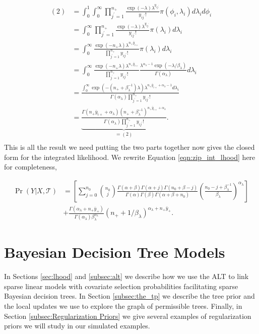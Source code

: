  \begin{align*}
 (2) &= \int_0^1\int_0^\infty\prod_{j^\prime=1}^{n_+}\frac{\exp{(-\lambda)}\lambda^{y_{ij^\prime}} }{y_{ij^\prime}!}\pi(\phi_i,\lambda_i )d\lambda_id\phi_i \\
 &= \int_0^\infty \prod_{j^\prime=1}^{n_+}\frac{\exp{(-\lambda)}\lambda^{y_{ij^\prime}} }{y_{ij^\prime}!}\pi(\lambda_i )d\lambda_i \\
 &= \int_0^\infty\frac{\exp{(-n_+\lambda)}\lambda^{n_+\bar{y}_{i+}} }{\prod_{j^\prime=1}^{n_+}y_{ij^\prime}!}\pi(\lambda_i )d\lambda_i \\
 &= \int_0^\infty\frac{\exp{(-n_+\lambda)}\lambda^{n_+\bar{y}_{i+}} }{\prod_{j^\prime=1}^{n_+}y_{ij^\prime}!}\frac{\lambda^{\alpha_{\lambda}-1}\exp{(-\lambda/\beta_{\lambda})}}{\Gamma(\alpha_{\lambda})}d\lambda_i \\
 &= \frac{\int_0^\infty\exp{(-(n_+ +\beta_{\lambda}^{-1})\lambda)}\lambda^{n_+\bar{y}_{i+} +\alpha_{\lambda}-1} d\lambda_i}{\Gamma(\alpha_{\lambda})\prod_{j^\prime=1}^{n_+}y_{ij^\prime}!} \\
 &= \underbrace{\frac{\Gamma(n_+\bar{y}_{i+}+\alpha_{\lambda})(n_+ +\beta_{\lambda}^{-1})^{n_+\bar{y}_{i+}+\alpha_{\lambda}}}{\Gamma(\alpha_{\lambda})\prod_{j^\prime=1}^{n_+}y_{ij^\prime}!}}_{=(2)}. \\
 \end{align*}
This is all the result we need putting the two parts together now gives the closed form for the integrated likelihood. We rewrite Equation \ref{eqn:zip_int_lhood} here for completeness, 

\begin{align}\nonumber
 \Pr(Y\vert X, \mathcal{T})& = \left[\sum_{j=0}^{n_0} {n_0 \choose j}\frac{\Gamma(\alpha+\beta)\Gamma(\alpha+j)\Gamma(n_0+\beta-j)}{\Gamma(\alpha)\Gamma(\beta)\Gamma(\alpha+\beta+n_0)}\left(\frac{n_0-j+\beta_{\lambda}^{-1}}{\beta_{\lambda}}\right)^{\alpha_{\lambda}} \right] \\ \nonumber
 & + \frac{\Gamma(\alpha_{\lambda}+n_+\bar{y}_+)}{\Gamma(\alpha_{\lambda})\beta_{\lambda}^{\alpha_{\lambda}}}\left(n_+ + 1/\beta_{\lambda} \right)^{\alpha_{\lambda}+n_+\bar{y}_+}.
\end{align}

\newpage

\section{Bayesian Decision Tree Models}\label{sec:Model}

In Sections \ref{sec:lhood} and \ref{subsec:alt} we describe how we use the ALT to link sparse linear models with covariate selection probabilities facilitating sparse Bayesian decision trees. In Section \ref{subsec:the_tp} we describe the tree prior and the local updates we use to explore the graph of permissible trees. Finally, in Section \ref{subsec:Regularization Priors} we give several examples of regularization priors we will study in our simulated examples.

